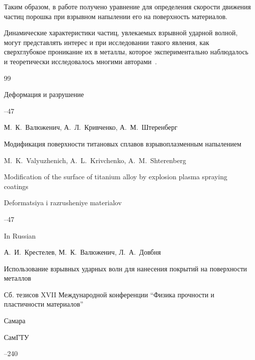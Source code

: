 Таким образом, в работе получено уравнение для определения скорости движения частиц порошка при взрывном напылении его на поверхность материалов. 

Динамические характеристики частиц, увлекаемых взрывной ударной волной, могут представлять интерес и при исследовании такого явления, как сверхглубокое проникание их в металлы, которое экспериментально наблюдалось и теоретически исследовалось многими авторами~\cite{krest:bib5,krest:bib6}.



\begin{thebibliography}{99}




\jour Деформация и разрушение



--47

\by М.~К.~Валюженич, А.~Л.~Кривченко, А.~М.~Штеренберг

\paper Модификация поверхности титановых сплавов взрывоплазменным напылением


\misctransl

\by M.~K.~Valyuzhenich, A.~L.~Krivchenko, A.~M.~Shterenberg

\paper Modification of the surface of titanium alloy by explosion plasma spraying  coatings

\jour Deformatsiya i razrusheniye materialov



–47

\lang In Russian






\by А.~И.~Крестелев, М.~К.~Валюженич, Л.~А.~Довбня

\paper Использование взрывных ударных волн для нанесения покрытий на поверхности металлов

\inbook Сб. тезисов XVII Международной конференции ``Физика прочности и пластичности материалов''

\publaddr Самара

\publ СамГТУ


--240


\end{thebibliography}
